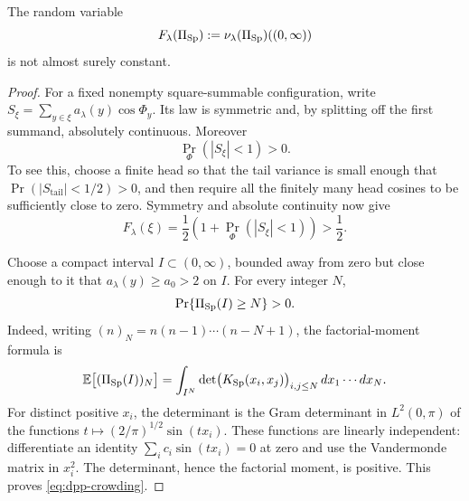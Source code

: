 \begin{proposition}
\label{prop:scalar-nondegenerate}
The random variable
\[
 F_\lambda(\Pi_{\mathrm{Sp}}):=\nu_\lambda(\Pi_{\mathrm{Sp}})((0,\infty))
\]
is not almost surely constant.
\end{proposition}

\begin{proof}
For a fixed nonempty square-summable configuration, write
\(S_\xi=\sum_{y\in\xi}a_\lambda(y)\cos\Phi_y\).  Its law is symmetric and,
by splitting off the first summand, absolutely continuous.  Moreover
\begin{equation}
 \Pr_\Phi(|S_\xi|<1)>0.
 \label{eq:positive-small-ball}
\end{equation}
To see this, choose a finite head so that the tail variance is small enough
 that \(\Pr(|S_{\mathrm{tail}}|<1/2)>0\), and then require all the finitely many
head cosines to be sufficiently close to zero.  Symmetry and absolute
continuity now give
\begin{equation}
 F_\lambda(\xi)
 =\frac12\left(1+\Pr_\Phi(|S_\xi|<1)\right)>\frac12.
 \label{eq:scalar-strict-half}
\end{equation}

Choose a compact interval \(I\subset(0,\infty)\), bounded away from zero
but close enough to it that
\(a_\lambda(y)\ge a_0>2\) on \(I\).  For every integer \(N\),
\begin{equation}
 \Pr\{\Pi_{\mathrm{Sp}}(I)\ge N\}>0.
 \label{eq:dpp-crowding}
\end{equation}
Indeed, writing \((n)_N=n(n-1)\cdots(n-N+1)\), the factorial-moment formula
\cite[Definitions~2 and~3, equations (1.5) and (1.20)]{Soshnikov2000} is
\[
 \mathbb E\bigl[(\Pi_{\mathrm{Sp}}(I))_N\bigr]
 =\int_{I^N}\det\bigl(K_{\mathrm{Sp}}(x_i,x_j)\bigr)_{i,j\le N}
   \,dx_1\cdots dx_N.
\]
For distinct positive \(x_i\), the determinant is the Gram determinant in
\(L^2(0,\pi)\) of the functions
\(t\mapsto(2/\pi)^{1/2}\sin(tx_i)\).  These functions are linearly independent:
differentiate an identity \(\sum_i c_i\sin(tx_i)=0\) at zero and use the
Vandermonde matrix in \(x_i^2\).  The determinant, hence the factorial moment,
is positive.  This proves \eqref{eq:dpp-crowding}.


\end{proof}
